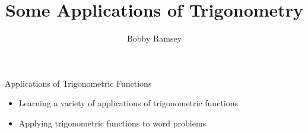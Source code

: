 \documentclass{ximera}
\author{Bobby Ramsey}
\title{Some Applications of Trigonometry}
\begin{document}
\begin{abstract}
\end{abstract}
\maketitle


\begin{objectives}
	\item Applications of Trigonometric Functions
		\begin{itemize}
			\item Learning a variety of applications of trigonometric functions
			\item Applying trigonometric functions to word problems
		\end{itemize}
\end{objectives}
\end{document}
